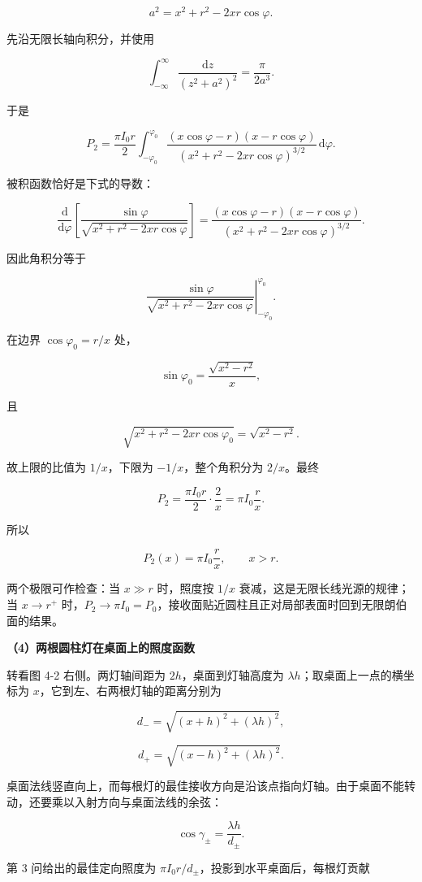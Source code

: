 \documentclass[12pt,a4paper,UTF8]{ctexart}
\begin{document}
\[a^2=x^2+r^2-2xr\cos\varphi.\]

先沿无限长轴向积分，并使用

\[
\int_{-\infty}^{\infty}
\frac{\mathrm{d}z}{(z^2+a^2)^2}
=\frac{\pi}{2a^3}.
\]

于是

\[
P_2=\frac{\pi I_0r}{2}
\int_{-\varphi_0}^{\varphi_0}
\frac{(x\cos\varphi-r)(x-r\cos\varphi)}
{(x^2+r^2-2xr\cos\varphi)^{3/2}}\,\mathrm{d}\varphi.
\]

被积函数恰好是下式的导数：

\[
\frac{\mathrm{d}}{\mathrm{d}\varphi}
\left[
\frac{\sin\varphi}
{\sqrt{x^2+r^2-2xr\cos\varphi}}
\right]
=\frac{(x\cos\varphi-r)(x-r\cos\varphi)}
{(x^2+r^2-2xr\cos\varphi)^{3/2}}.
\]

因此角积分等于

\[
\left.
\frac{\sin\varphi}
{\sqrt{x^2+r^2-2xr\cos\varphi}}
\right|_{-\varphi_0}^{\varphi_0}.
\]

在边界 \(\cos\varphi_0=r/x\) 处，

\[
\sin\varphi_0=\frac{\sqrt{x^2-r^2}}{x},
\]

且

\[
\sqrt{x^2+r^2-2xr\cos\varphi_0}
=\sqrt{x^2-r^2}.
\]

故上限的比值为 \(1/x\)，下限为 \(-1/x\)，整个角积分为 \(2/x\)。最终

\[
P_2=\frac{\pi I_0r}{2}\cdot\frac2x
=\pi I_0\frac rx.
\]

所以

\[
\boxed{P_2(x)=\pi I_0\frac rx},
\qquad x>r.
\]

两个极限可作检查：当 \(x\gg r\) 时，照度按 \(1/x\)
衰减，这是无限长线光源的规律；当 \(x\to r^+\)
时，\(P_2\to\pi I_0=P_0\)，接收面贴近圆柱且正对局部表面时回到无限朗伯面的结果。

\textbf{（4）两根圆柱灯在桌面上的照度函数}

转看图 4-2 右侧。两灯轴间距为 \(2h\)，桌面到灯轴高度为
\(\lambda h\)；取桌面上一点的横坐标为
\(x\)，它到左、右两根灯轴的距离分别为

\[
d_- =\sqrt{(x+h)^2+(\lambda h)^2},
\]

\[
d_+ =\sqrt{(x-h)^2+(\lambda h)^2}.
\]

桌面法线竖直向上，而每根灯的最佳接收方向是沿该点指向灯轴。由于桌面不能转动，还要乘以入射方向与桌面法线的余弦：

\[
\cos\gamma_\pm=\frac{\lambda h}{d_\pm}.
\]

第 3 问给出的最佳定向照度为
\(\pi I_0r/d_\pm\)，投影到水平桌面后，每根灯贡献
\end{document}
